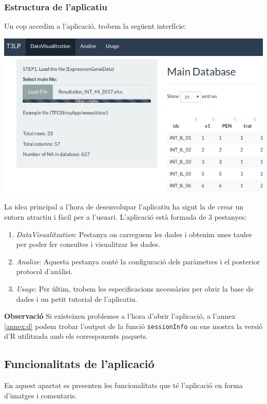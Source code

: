 \documentclass[english]{article}
\begin{document}
\subsubsection{Estructura de l'aplicatiu}
Un cop accedim a l'aplicació, trobem la següent interfície:
\begin{center}
\includegraphics[scale=0.3]{app1.png}
\end{center}

La idea principal a l'hora de desenvolupar l'aplicatiu ha sigut la de crear un entorn atractiu i fàcil per a l'usuari. L'aplicació està formada de 3 pestanyes:
\begin{enumerate}
\item \textit{DataVisualitzation}: Pestanya on carreguem les dades i obtenim unes taules per poder fer consultes i visualitzar les dades.
\item \textit{Analize}: Aquesta pestanya conté la configuració dels paràmetres i el posterior protocol d'anàlisi.
\item \textit{Usage}: Per últim, trobem les especificacions necessàries per obrir la base de dades i un petit tutorial de l'aplicatiu.
\end{enumerate}

\textbf{Observació} Si existeixen problemes a l'hora d'obrir l'aplicació, a l'annex \ref{annex:d} podem trobar l'output de la funció \texttt{sessionInfo} on ens mostra la versió d'R utilitzada amb els corresponents paquets.
\clearpage
\subsection{Funcionalitats de l'aplicació}
En aquest apartat es presenten les funcionalitats que té l'aplicació en forma d'imatges i comentaris.
\\
\end{document}
